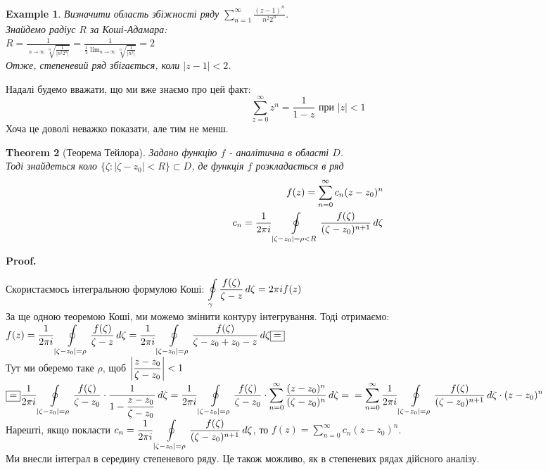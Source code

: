 \documentclass[a4paper, 10pt]{article}
\makeatletter
\DeclareMathOperator*\uplim{\overline{lim}}
\def\qed{$\blacksquare$}
\theoremstyle{theoremdd}
\newtheorem{theorem}{Theorem}[subsection]
\theoremstyle{theoremdd}
\theoremstyle{theoremdd}
\theoremstyle{theoremdd}
\newtheorem{example}[theorem]{Example}
\theoremstyle{theoremdd}
\theoremstyle{theoremdd}
\theoremstyle{theoremdd}
\theoremstyle{theoremdd}
\renewenvironment{proof}[1][Proof.\\]{\par
\pushQED{\hfill \qed}%
\normalfont \topsep6\p@\@plus6\p@\relax
\trivlist
\item\relax
{\bfseries
#1\@addpunct{.}}\hspace\labelsep\ignorespaces
}{%
\popQED\endtrivlist\@endpefalse
}
\makeatother
\begin{document}
\begin{example}
Визначити область збіжності ряду $\displaystyle \sum_{n=1}^{\infty} \frac{(z-1)^n}{n^2 2^n}$.\\
Знайдемо радіус $R$ за Коші-Адамара:\\
$R = \displaystyle\frac{1}{\displaystyle\uplim_{n \to \infty} \sqrt[n]{\frac{1}{|n^2 2^n|}}} = \frac{1}{\displaystyle \frac{1}{2} \lim_{n \to \infty} \sqrt[n]{\frac{1}{|n^2|}} } = 2$\\
Отже, степеневий ряд збігається, коли $|z-1|<2$.
\end{example}

Надалі будемо вважати, що ми вже знаємо про цей факт: $$\displaystyle \sum_{z=0}^{\infty} z^n = \frac{1}{1-z} \text{ при } |z|<1$$
Хоча це доволі неважко показати, але тим не менш.

\begin{theorem}[Теорема Тейлора]
Задано функцію $f$ - аналітична в області $D$.\\ Тоді знайдеться коло $\{\zeta: |\zeta-z_0|<R\} \subset D$, де функція $f$ розкладається в ряд
\begin{align*}
	f(z) = \sum_{n=0}^{\infty} c_n(z-z_0)^n \\
	c_n = \frac{1}{2\pi i} \oint\displaylimits_{|\zeta-z_0|=\rho<R} \frac{f(\zeta)}{(\zeta-z_0)^{n+1}}\,d\zeta
\end{align*}
\end{theorem}

\begin{proof}
Скористаємось інтегральною формулою Коші:
	$\displaystyle \oint\displaylimits_{\gamma} \frac{f(\zeta)}{\zeta-z}\,d\zeta = 2\pi i f(z)$\\
	За ще одною теоремою Коші, ми можемо змінити контуру інтегрування. Тоді отримаємо:\\
	$f(z) = \displaystyle \frac{1}{2\pi i} \oint\displaylimits_{|\zeta-z_0|=\rho} \frac{f(\zeta)}{\zeta-z}\,d\zeta = \frac{1}{2\pi i}\oint\displaylimits_{|\zeta-z_0|=\rho} \frac{f(\zeta)}{\zeta-z_0+z_0-z}\,d\zeta \boxed{=}$\\
	Тут ми оберемо таке $\rho$, щоб $\displaystyle \abs{\frac{z-z_0}{\zeta - z_0}}<1$\\
	$\boxed{=} \displaystyle \frac{1}{2\pi i} \oint\displaylimits_{|\zeta-z_0|=\rho} \frac{f(\zeta)}{\zeta-z_0} \cdot \frac{1}{\displaystyle 1- \frac{z-z_0}{\zeta -z_0}} \,d\zeta = \frac{1}{2\pi i}\oint\displaylimits_{|\zeta-z_0|=\rho} \frac{f(\zeta)}{\zeta-z_0} \cdot \sum_{n=0}^{\infty} \frac{(z-z_0)^n}{(\zeta-z_0)^n} \,d\zeta = \\ = \sum_{n=0}^{\infty}\frac{1}{2\pi i} \oint\displaylimits_{|\zeta-z_0|=\rho} \frac{f(\zeta)}{(\zeta-z_0)^{n+1}} \,d\zeta \cdot (z-z_0)^n$\\
	Нарешті, якщо покласти $c_n = \displaystyle\frac{1}{2\pi i}\oint\displaylimits_{|\zeta-z_0|=\rho} \frac{f(\zeta)}{(\zeta-z_0)^{n+1}} \,d\zeta$, то $f(z) = \displaystyle\sum_{n=0}^{\infty} c_n(z-z_0)^n$.\\
	Ми внесли інтеграл в середину степеневого ряду. Це також можливо, як в степеневих рядах дійсного аналізу.
\end{proof}
\end{document}
